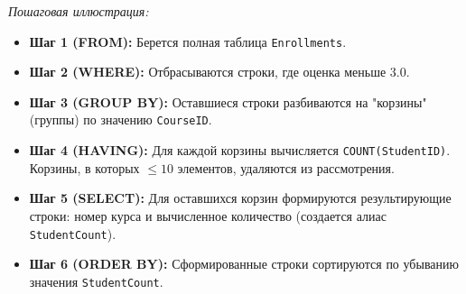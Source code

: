 \documentclass[12pt,a4paper]{article}
\begin{document}
\textit{Пошаговая иллюстрация:}
\begin{itemize}
    \item \textbf{Шаг 1 (FROM):} Берется полная таблица \texttt{Enrollments}.
    \item \textbf{Шаг 2 (WHERE):} Отбрасываются строки, где оценка меньше $3.0$.
    \item \textbf{Шаг 3 (GROUP BY):} Оставшиеся строки разбиваются на "корзины" (группы) по значению \texttt{CourseID}.
    \item \textbf{Шаг 4 (HAVING):} Для каждой корзины вычисляется \texttt{COUNT(StudentID)}. Корзины, в которых $\leq 10$ элементов, удаляются из рассмотрения.
    \item \textbf{Шаг 5 (SELECT):} Для оставшихся корзин формируются результирующие строки: номер курса и вычисленное количество (создается алиас \texttt{StudentCount}).
    \item \textbf{Шаг 6 (ORDER BY):} Сформированные строки сортируются по убыванию значения \texttt{StudentCount}.
\end{itemize}
\end{document}
